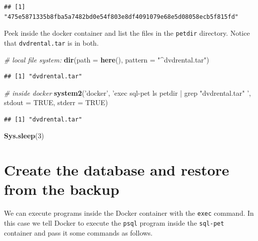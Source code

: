 \documentclass[]{book}
\newenvironment{Shaded}{\begin{snugshade}}{\end{snugshade}}
\newcommand{\CommentTok}[1]{\textcolor[rgb]{0.56,0.35,0.01}{\textit{#1}}}
\newcommand{\DataTypeTok}[1]{\textcolor[rgb]{0.13,0.29,0.53}{#1}}
\newcommand{\DecValTok}[1]{\textcolor[rgb]{0.00,0.00,0.81}{#1}}
\newcommand{\KeywordTok}[1]{\textcolor[rgb]{0.13,0.29,0.53}{\textbf{#1}}}
\newcommand{\NormalTok}[1]{#1}
\newcommand{\OtherTok}[1]{\textcolor[rgb]{0.56,0.35,0.01}{#1}}
\newcommand{\StringTok}[1]{\textcolor[rgb]{0.31,0.60,0.02}{#1}}
\theoremstyle{definition}
\theoremstyle{definition}
\theoremstyle{definition}
\theoremstyle{remark}
\begin{document}
\begin{verbatim}
## [1] "475e5871335b8fba5a7482bd0e54f803e8df4091079e68e5d08058ecb5f815fd"
\end{verbatim}

Peek inside the docker container and list the files in the
\texttt{petdir} directory. Notice that \texttt{dvdrental.tar} is in
both.

\begin{Shaded}
\begin{Highlighting}[]
\CommentTok{# local file system:}
\KeywordTok{dir}\NormalTok{(}\DataTypeTok{path =} \KeywordTok{here}\NormalTok{(), }\DataTypeTok{pattern =} \StringTok{"^dvdrental.tar"}\NormalTok{)}
\end{Highlighting}
\end{Shaded}

\begin{verbatim}
## [1] "dvdrental.tar"
\end{verbatim}

\begin{Shaded}
\begin{Highlighting}[]
\CommentTok{# inside docker}
\KeywordTok{system2}\NormalTok{(}\StringTok{'docker'}\NormalTok{, }\StringTok{'exec sql-pet ls petdir | grep "dvdrental.tar" '}\NormalTok{,}
        \DataTypeTok{stdout =} \OtherTok{TRUE}\NormalTok{, }\DataTypeTok{stderr =} \OtherTok{TRUE}\NormalTok{)}
\end{Highlighting}
\end{Shaded}

\begin{verbatim}
## [1] "dvdrental.tar"
\end{verbatim}

\begin{Shaded}
\begin{Highlighting}[]
\KeywordTok{Sys.sleep}\NormalTok{(}\DecValTok{3}\NormalTok{)}
\end{Highlighting}
\end{Shaded}

\hypertarget{create-the-database-and-restore-from-the-backup}{%
\section{Create the database and restore from the
backup}\label{create-the-database-and-restore-from-the-backup}}

We can execute programs inside the Docker container with the
\texttt{exec} command. In this case we tell Docker to execute the
\texttt{psql} program inside the \texttt{sql-pet} container and pass it
some commands as follows.
\end{document}
